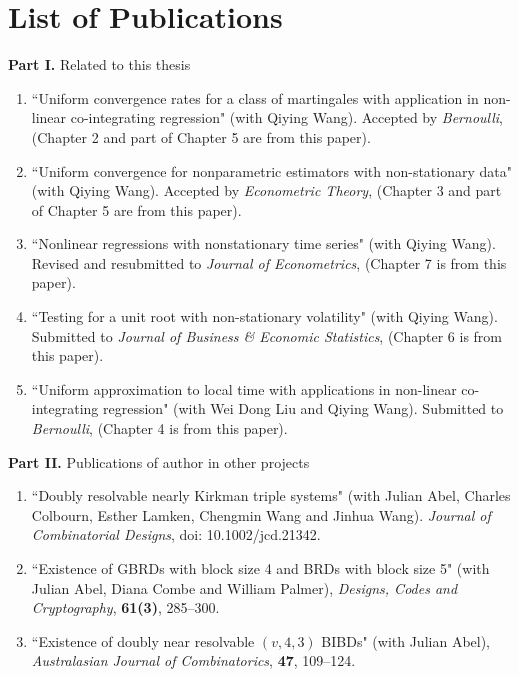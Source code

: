 \chapter{List of Publications}

{\bf Part I.} Related to this thesis
\begin{enumerate}
\item ``Uniform convergence rates for a class of martingales with application in non-linear co-integrating regression" (with Qiying Wang). Accepted by {\it Bernoulli}, (Chapter 2 and part of Chapter 5 are from this paper).
\item ``Uniform convergence for nonparametric estimators with non-stationary data" (with Qiying Wang). Accepted by {\it Econometric Theory}, (Chapter 3 and part of Chapter 5 are from this paper).
\item ``Nonlinear regressions with nonstationary time series" (with Qiying Wang). Revised and resubmitted to {\it Journal of Econometrics}, (Chapter 7 is from this paper).
\item ``Testing for a unit root with non-stationary volatility" (with Qiying Wang). Submitted to {\it Journal of Business \& Economic Statistics}, (Chapter 6 is from this paper).
\item ``Uniform approximation to local time with applications in non-linear co-integrating regression" (with Wei Dong Liu and Qiying Wang). Submitted to {\it Bernoulli}, (Chapter 4 is from this paper).
\end{enumerate}

\medskip
\noindent
{\bf Part II.} Publications of author in other projects
\begin{enumerate}
\item ``Doubly resolvable nearly Kirkman triple systems" (with Julian Abel, Charles Colbourn, Esther Lamken, Chengmin Wang and Jinhua Wang). {\it Journal of Combinatorial Designs}, doi: 10.1002/jcd.21342.
\item ``Existence of GBRDs with block size 4 and BRDs with block size 5" (with Julian Abel, Diana Combe and William Palmer), {\it Designs, Codes and Cryptography}, {\bf 61(3)}, 285--300.
\item ``Existence of doubly near resolvable $(v, 4, 3)$ BIBDs" (with Julian Abel), {\it Australasian Journal of Combinatorics}, {\bf 47}, 109--124.
\end{enumerate}


